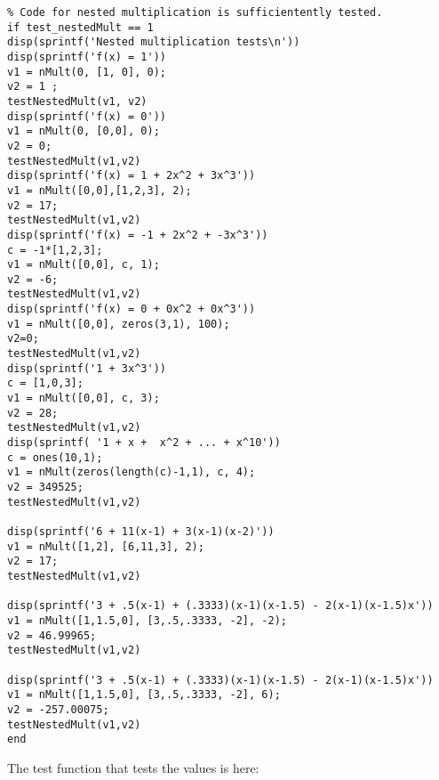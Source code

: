 \documentclass[]{article}
\begin{document}
\begin{lstlisting}
% Code for nested multiplication is sufficientently tested. 
if test_nestedMult == 1
disp(sprintf('Nested multiplication tests\n'))
disp(sprintf('f(x) = 1'))
v1 = nMult(0, [1, 0], 0);
v2 = 1 ;
testNestedMult(v1, v2)
disp(sprintf('f(x) = 0'))
v1 = nMult(0, [0,0], 0);
v2 = 0;
testNestedMult(v1,v2)
disp(sprintf('f(x) = 1 + 2x^2 + 3x^3'))
v1 = nMult([0,0],[1,2,3], 2);
v2 = 17;
testNestedMult(v1,v2)
disp(sprintf('f(x) = -1 + 2x^2 + -3x^3'))
c = -1*[1,2,3];
v1 = nMult([0,0], c, 1);
v2 = -6;
testNestedMult(v1,v2)
disp(sprintf('f(x) = 0 + 0x^2 + 0x^3'))
v1 = nMult([0,0], zeros(3,1), 100);
v2=0;
testNestedMult(v1,v2)
disp(sprintf('1 + 3x^3'))
c = [1,0,3];
v1 = nMult([0,0], c, 3);
v2 = 28;
testNestedMult(v1,v2)
disp(sprintf( '1 + x +  x^2 + ... + x^10'))
c = ones(10,1);
v1 = nMult(zeros(length(c)-1,1), c, 4);
v2 = 349525;
testNestedMult(v1,v2)

disp(sprintf('6 + 11(x-1) + 3(x-1)(x-2)'))
v1 = nMult([1,2], [6,11,3], 2);
v2 = 17;
testNestedMult(v1,v2)

disp(sprintf('3 + .5(x-1) + (.3333)(x-1)(x-1.5) - 2(x-1)(x-1.5)x'))
v1 = nMult([1,1.5,0], [3,.5,.3333, -2], -2);
v2 = 46.99965;
testNestedMult(v1,v2)

disp(sprintf('3 + .5(x-1) + (.3333)(x-1)(x-1.5) - 2(x-1)(x-1.5)x'))
v1 = nMult([1,1.5,0], [3,.5,.3333, -2], 6);
v2 = -257.00075;
testNestedMult(v1,v2)
end 
\end{lstlisting}

The test function that tests the values is here:

\end{document}
